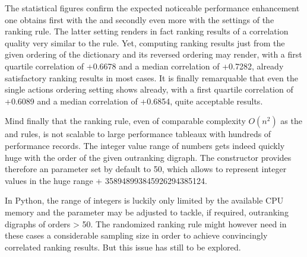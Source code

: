 \documentclass[a4paper,12pt,english]{sphinxhowto}
\begin{document}
\sphinxAtStartPar
The statistical figures confirm the expected noticeable performance enhancement one obtains first with the  and secondly even more with the  settings of the  ranking rule. The latter setting renders in fact ranking results of a correlation quality very similar to the  rule. Yet, computing ranking results just from the given ordering of the  dictionary and its reversed ordering may render, with a first quartile correlation of +0.6678 and a median correlation of +0.7282, already satisfactory ranking results in most cases. It is finally remarquable that even the single actions ordering setting shows already, with a first quartile correlation of +0.6089 and a median correlation of +0.6854, quite acceptable results.

\sphinxAtStartPar
Mind finally that the  ranking rule, even of comparable complexity \(O(n^2)\) as the  and  rules, is not scalable to large performance tableaux with hundreds of performance records. The integer value range of  numbers gets indeed quickly huge with the order of the given outranking digraph. The  constructor provides therefore an  parameter set by default to 50, which allows to represent integer values in the huge range +\sphinxhyphen{} 358948993845926294385124.

\begin{sphinxVerbatim}[commandchars=\\\{\},numbers=left,firstnumber=1,stepnumber=1]
  \PYG{p}{[}    \PYG{p}{]}
  
\end{sphinxVerbatim}

\sphinxAtStartPar
In Python, the range of integers is luckily only limited by the available CPU memory and the  parameter may be adjusted to tackle, if required, outranking digraphs of orders \textgreater{} 50. The randomized  ranking rule might however need in these cases a considerable sampling size in order to achieve convincingly correlated ranking results. But this issue has still to be explored.
\end{document}
